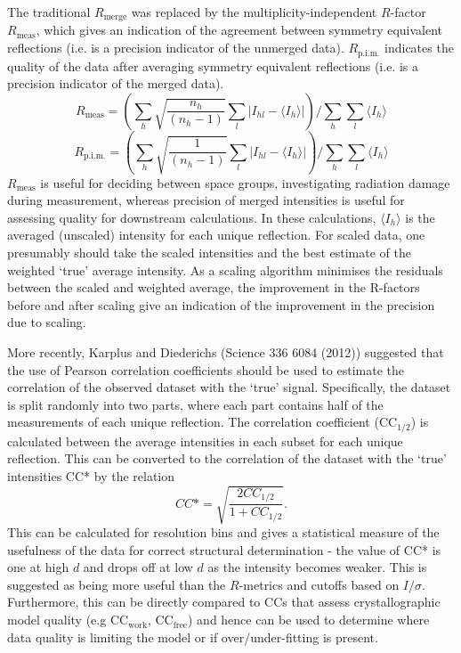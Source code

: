 \documentclass[11pt, oneside]{article}   	%
\begin{document}
The traditional $R_{\text{merge}}$ was replaced by the multiplicity-independent $R$-factor $R_{\text{meas}}$, which gives an indication of the agreement between symmetry equivalent reflections (i.e. is a precision indicator of the unmerged data). $R_{\text{p.i.m.}}$ indicates the quality of the data after averaging symmetry equivalent reflections (i.e. is a precision indicator of the merged data). 
\begin{equation}
R_{\text{meas}} = \left( \sum_{h} \sqrt{\frac{n_h}{(n_h - 1)}} \sum_l \left| I_{hl} - \langle I_h \rangle \right| \right) / \sum_h \sum_l \langle I_h \rangle
\end{equation}
\begin{equation}
R_{\text{p.i.m.}} = \left( \sum_{h} \sqrt{\frac{1}{(n_h - 1)}} \sum_l \left| I_{hl} - \langle I_h \rangle \right| \right) / \sum_h \sum_l \langle I_h \rangle
\end{equation}
$R_{\text{meas}}$ is useful for deciding between space groups, investigating radiation damage during measurement, whereas precision of merged intensities is useful for assessing quality for downstream calculations. In these calculations, $\langle I_h \rangle$ is the averaged (unscaled) intensity for each unique reflection.
For scaled data, one presumably should take the scaled intensities and the best estimate of the weighted `true' average intensity. As a scaling algorithm minimises the residuals between the scaled and weighted average, the improvement in the R-factors before and after scaling give an indication of the improvement in the precision due to scaling.

More recently, Karplus and Diederichs (Science 336 6084 (2012)) suggested that the use of Pearson correlation coefficients should be used to estimate the correlation of the observed dataset with the `true' signal. Specifically, the dataset is split randomly into two parts, where each part contains half of the measurements of each unique reflection. The correlation coefficient (CC$_{1/2}$) is calculated between the average intensities in each subset for each unique reflection. This can be converted to the correlation of the dataset with the `true' intensities CC* by the relation
\begin{equation}
CC* = \sqrt{\frac{2 CC_{1/2}}{1 + CC_{1/2}}}.
\end{equation}
This can be calculated for resolution bins and gives a statistical measure of the usefulness of the data for correct structural determination - the value of CC* is one at high $d$ and drops off at low $d$ as the intensity becomes weaker. This is suggested as being more useful than the $R$-metrics and cutoffs based on $I/\sigma$. Furthermore, this can be directly compared to CCs that assess crystallographic model quality (e.g CC$_{\text{work}}$, CC$_{\text{free}}$) and hence can be used to determine where data quality is limiting the model or if over/under-fitting is present.
\end{document}
